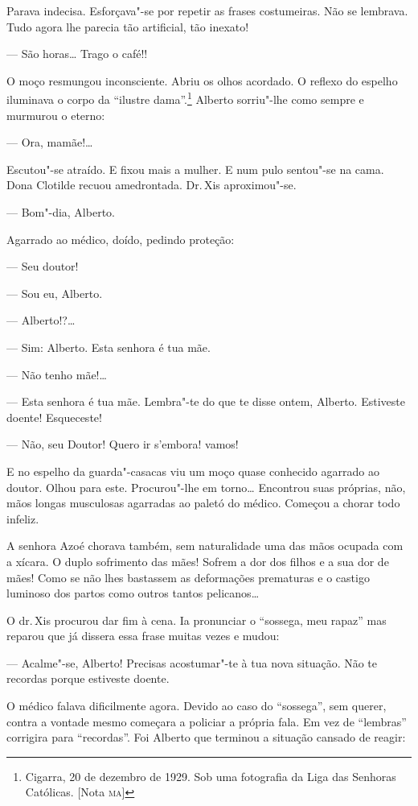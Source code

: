 Parava indecisa. Esforçava"-se por repetir as frases costumeiras. Não se
lembrava. Tudo agora lhe parecia tão artificial, tão inexato!

--- São horas\ldots{} Trago o café!!

O moço resmungou inconsciente. Abriu os olhos acordado. O reflexo do
espelho iluminava o corpo da ``ilustre dama''.\footnote{Cigarra, 20 de
  dezembro de 1929. Sob uma fotografia da Liga das Senhoras Católicas.
  {[}Nota \textsc{ma}{]}} Alberto sorriu"-lhe como sempre e murmurou o eterno:

--- Ora, mamãe!\ldots{}

Escutou"-se atraído. E fixou mais a mulher. E num pulo sentou"-se na cama.
Dona Clotilde recuou amedrontada. Dr.\,Xis aproximou"-se.

--- Bom"-dia, Alberto.

Agarrado ao médico, doído, pedindo proteção:

--- Seu doutor!

--- Sou eu, Alberto.

--- Alberto!?\ldots{}

--- Sim: Alberto. Esta senhora é tua mãe.

--- Não tenho mãe!\ldots{}

--- Esta senhora é tua mãe. Lembra"-te do que te disse ontem, Alberto.
Estiveste doente! Esqueceste!

--- Não, seu Doutor! Quero ir s'embora! vamos!

E no espelho da guarda"-casacas viu um moço quase conhecido agarrado ao
doutor. Olhou para este. Procurou"-lhe em torno\ldots{} Encontrou suas
próprias, não, mãos longas musculosas agarradas ao paletó do médico.
Começou a chorar todo infeliz.

A senhora Azoé chorava também, sem naturalidade uma das mãos ocupada com
a xícara. O duplo sofrimento das mães! Sofrem a dor dos filhos e a sua
dor de mães! Como se não lhes bastassem as deformações prematuras e o
castigo luminoso dos partos como outros tantos pelicanos\ldots{}

O dr.\,Xis procurou dar fim à cena. Ia pronunciar o ``sossega, meu
rapaz'' mas reparou que já dissera essa frase muitas vezes e mudou:

--- Acalme"-se, Alberto! Precisas acostumar"-te à tua nova situação. Não
te recordas porque estiveste doente.

O médico falava dificilmente agora. Devido ao caso do ``sossega'', sem
querer, contra a vontade mesmo começara a policiar a própria fala. Em
vez de ``lembras'' corrigira para ``recordas''. Foi Alberto que terminou
a situação cansado de reagir:

